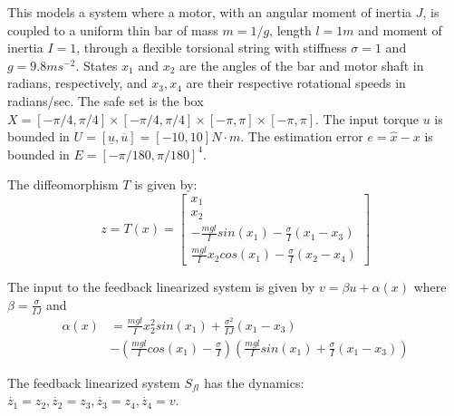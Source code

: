 This models a system where a motor, with an angular moment of inertia $J$,  is coupled to a uniform thin bar of mass $m=1/g$, length $l=1m$ and moment of inertia $I=1$, through a flexible torsional string with stiffness $\sigma=1$ and $g=9.8ms^{-2}$. 
States $x_1$ and $x_2$ are the angles of the bar and motor shaft in radians, respectively, and $x_3, x_4$ are their respective rotational speeds in radians/sec.
The safe set is the box $X = [-\pi/4,\pi/4] \times [-\pi/4,\pi/4] \times [-\pi,\pi] \times [-\pi,\pi]$.
The input torque $u$ is bounded in $U = [\underline{u}, \overline{u}] = [-10 , 10 ]N\cdot m$. 
The estimation error $e = \hat{x} - x$ is bounded in $E = [-\pi /180, \pi /180]^4$.

The diffeomorphism $T$ is given by:
\begin{equation}
z = T(x) = \begin{bmatrix} x_1 \\ x_2 \\ -\frac{mgl}{I}sin(x_1) -\frac{\sigma}{I}(x_1-x_3) \\ \frac{mgl}{I}x_2cos(x_1) - \frac{\sigma}{I}(x_2-x_4)   \end{bmatrix} \nonumber
\end{equation}

The input to the feedback linearized system is given by $v=\beta u+ \alpha(x)$ where $\beta=\frac{\sigma}{IJ} $ and 
\begin{subequations}
\label{eq:fblin_inp}
\begin{align}
\alpha(x)&=\frac{mgl}{I}x_2^2sin(x_1) + \frac{\sigma^2}{IJ}(x_1-x_3) \nonumber \\
&- (\frac{mgl}{I}cos(x_1)-\frac{\sigma}{I})(\frac{mgl}{I}sin(x_1)+\frac{\sigma}{I}(x_1-x_3))
\end{align}
\end{subequations}

The feedback linearized system $S_{fl}$ has the dynamics:
$\dot{z_1} = z_2, \dot{z_2} = z_3, \dot{z_3} = z_4, \dot{z_4} = v$.


